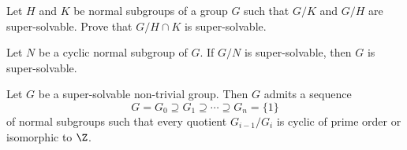 \begin{exercise}
\label{xca:super_quotient}
Let $H$ and $K$ be normal subgroups of a group $G$ such that $G/K$ and $G/H$
are super-solvable. Prove that $G/H\cap K$ is super-solvable. 
\end{exercise}


\begin{exercise}
\label{xca:Nciclico}
Let $N$ be a cyclic normal subgroup of $G$. If $G/N$ is super-solvable, then 
$G$ is super-solvable. 
\end{exercise}



\begin{theorem}
\label{thm:ZorCp}
Let $G$ be a super-solvable non-trivial group. Then $G$ admits a sequence 
\[
G=G_0\supseteq G_1\supseteq\cdots\supseteq G_n=\{1\}
\]
of normal subgroups 
such that every quotient $G_{i-1}/G_i$ is cyclic of prime order or isomorphic to 
$\Z$.
\end{theorem}

